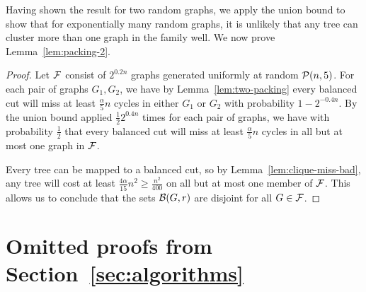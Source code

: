 Having shown the result for two random graphs, we apply the union bound to show that for exponentially many random graphs, it is unlikely that any tree can cluster more than one graph in the family well. We now prove Lemma~\ref{lem:packing-2}.

\begin{proof}
    Let $\mathcal{F}$ consist of $2^{0.2n}$ graphs generated uniformly at random $\mathcal{P}(n,5)$. For each pair of graphs $G_1, G_2$, we have by Lemma~\ref{lem:two-packing} every balanced cut will miss at least $\frac{\alpha}{5} n$ cycles in either $G_1$ or $G_2$ with probability $1-2^{-0.4n}$. By the union bound applied $\frac{1}{2}2^{0.4n}$ times for each pair of graphs, we have with probability $\frac{1}{2}$ that every balanced cut will miss at least $\frac{\alpha}{5} n$ cycles in all but at most one graph in $\mathcal{F}$.
    
    Every tree can be mapped to a balanced cut, so by Lemma~\ref{lem:clique-miss-bad}, any tree will cost at least $\frac{4\alpha}{15}n^2 \geq \frac{n^2}{400}$ on all but at most one member of $\mathcal{F}$. This allows us to conclude that the sets $\mathcal{B}(G,r)$ are disjoint for all $G \in \mathcal{F}$.
\end{proof}


\section{Omitted proofs from Section~\ref{sec:algorithms}}

